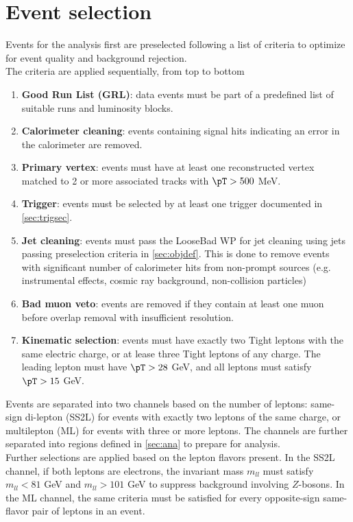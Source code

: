 \documentclass[../thesis.tex]{subfiles}
\begin{document}
\vspace{-1\baselineskip}


\section{Event selection}
Events for the analysis first are preselected following a list of criteria to optimize for event quality and background rejection.\\
The criteria are applied sequentially, from top to bottom

\begin{enumerate}
\item \textbf{Good Run List (GRL)}: data events must be part of a predefined list of suitable runs and luminosity blocks.
\item \textbf{Calorimeter cleaning}: events containing signal hits indicating an error in the calorimeter are removed.
\item \textbf{Primary vertex}: events must have at least one reconstructed vertex matched to 2 or more associated tracks with $\pT>500$ MeV.
\item \textbf{Trigger}: events must be selected by at least one trigger documented in \autoref{sec:trigsec}.
\item \textbf{Jet cleaning}: events must pass the LooseBad WP for jet cleaning using jets passing preselection criteria in \autoref{sec:objdef}. This is done to remove events with significant number of calorimeter hits from non-prompt sources (e.g. instrumental effects, cosmic ray background, non-collision particles)
\item \textbf{Bad muon veto}: events are removed if they contain at least one muon before overlap removal with insufficient \pT resolution.
\item \textbf{Kinematic selection}: events must have exactly two Tight leptons with the same electric charge, or at lease three Tight leptons of any charge. The leading lepton must have $\pT>28$ GeV, and all leptons must satisfy $\pT>15$ GeV.
\end{enumerate}
Events are separated into two channels based on the number of leptons: same-sign di-lepton (SS2L) for events with exactly two leptons of the same charge, or multilepton (ML) for events with three or more leptons. The channels are further separated into regions defined in \autoref{sec:ana} to prepare for analysis.\\
Further selections are applied based on the lepton flavors present. In the SS2L channel, if both leptons are electrons, the invariant mass $m_{ll}$ must satisfy $m_{ll}<81$ GeV and $m_{ll}>101$ GeV to suppress background involving $Z$-bosons. In the ML channel, the same criteria must be satisfied for every opposite-sign same-flavor pair of leptons in an event.
\end{document}
